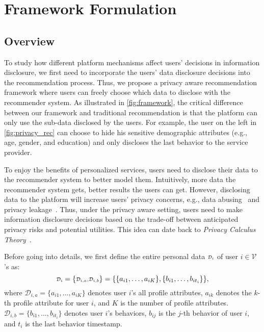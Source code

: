 \section{Framework Formulation}






\subsection{Overview} %


To study how different platform mechanisms affect users' decisions in information disclosure, we first need to incorporate the users' data disclosure decisions into the recommendation process.
Thus, we propose a privacy aware recommendation framework where users can freely choose which data to disclose with the recommender system.
As illustrated in \cref{fig:framework}, the critical difference between our framework and traditional recommendation is that the platform can only use the sub-data disclosed by the users. 
For example, the user on the left in \cref{fig:privacy_rec} can choose to hide his sensitive demographic attributes (e.g., age, gender, and education) and only discloses the last behavior to the service provider. 


To enjoy the benefits of personalized services, users need to disclose their data to the recommender system to better model them.
Intuitively, more data the recommender system gets, better results the users can get.
However, disclosing data to the platform will increase users' privacy concerns, e.g., data abusing~\cite{Mayer:sp12:Third} and privacy leakage~\cite{zhang2021membership}.
Thus, under the privacy aware setting, users need to make information disclosure decisions based on the trade-off between anticipated privacy risks and potential utilities.
This idea can date back to \textit{Privacy Calculus Theory}~\cite{Laufer:si77:Privacy,Culnan:os99:Information}.

Before going into details, we first define the entire personal data ${\scriptstyle \mathcal{D}_i}$ of user $i \in \mathcal{V}$'s as:
\begin{equation}
{\scriptstyle \mathcal{D}_i} = \{{\scriptstyle \mathcal{D}_{i,a}, \mathcal{D}_{i,b}} \}= \{\{a_{i1},\dots, a_{iK}\}, \{b_{i1},\dots, b_{it_i}\}\},
\label{eq:di}
\end{equation}
where ${\scriptstyle \mathcal{D}_{i,a}}{=}\{a_{i1},\dots, a_{iK}\}$ denotes user $i$'s all profile attributes, $a_{ik}$ denotes the $k$-th profile attribute for user $i$, and $K$ is the number of profile attributes. ${\scriptstyle \mathcal{D}_{i,b}}{=}\{b_{i1},\dots, b_{it_i}\}$ denotes user $i$'s behaviors, $b_{ij}$ is the $j$-th behavior of user $i$, and $t_i$ is the last behavior timestamp.  %

